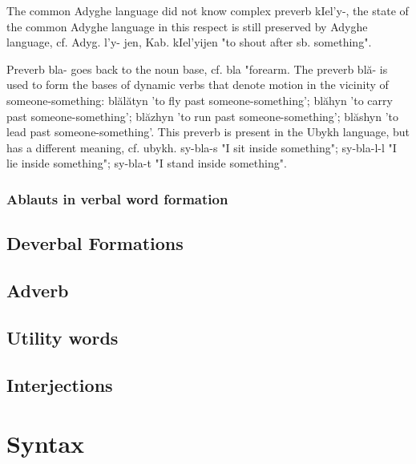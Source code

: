 \documentclass[a4paper,12pt]{book}
\newcommand{\1}[1]{\textbf{\emph{#1}}} %
\newcommand{\2}[1]{\textbf{[#1]}} %
\newcommand{\3}[1]{\fontsize{11pt}{0cm}\textbf{\emph{#1}}} %
\newcommand{\4}[1]{\fontsize{10pt}{0cm}\emph{#1}}	%
\newcommand{\5}[1]{\textbf{/#1/}} %
\newcommand{\6}[1]{\textbf{[#1]}} %
\newcommand{\7}[1]{\fontsize{12pt}{0cm}\emph{#1}} %
\newcommand{\8}[1]{\fontsize{12pt}{0cm}`#1'} %
\newcommand{\9}[1]{\fontsize{12pt}{0cm}(lit. `#1')} %
\begin{document}
The common Adyghe language did not know complex preverb kIel'y-, the state of the common Adyghe language in this respect is still preserved by Adyghe language, cf. Adyg. l'y- jen, Kab. kIel'yijen "to shout after sb. something".

Preverb bla- goes back to the noun base, cf. bla "forearm. The preverb blă- is used to form the bases of dynamic verbs that denote motion in the vicinity of someone-something: blălătyn 'to fly past someone-something'; blăhyn 'to carry past someone-something'; blăzhyn 'to run past someone-something'; blăshyn 'to lead past someone-something'.
This preverb is present in the Ubykh language, but has a different meaning, cf. ubykh. sy-bla-s "I sit inside something"; sy-bla-l-l "I lie inside something"; sy-bla-t "I stand inside something".

\subsection{Ablauts in verbal word formation}

\section{Deverbal Formations}
\section{Adverb}
\section{Utility words}
\section{Interjections}
\chapter{Syntax}
\end{document}
